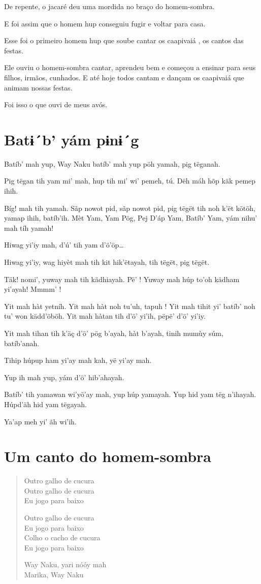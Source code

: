 De repente, o jacaré deu
uma mordida no braço do
homem-sombra.

E foi assim que
o homem hup
conseguiu fugir e
voltar para casa.

Esse foi o primeiro
homem hup que
soube cantar
os caapivaiá , os
cantos das festas.

Ele ouviu o homem-sombra cantar,
aprendeu bem e
começou a ensinar
para seus filhos,
irmãos, cunhados.
E até hoje todos
cantam e dançam os
caapivaiá que animam
nossas festas.

Foi isso o que ouvi de
meus avós.


\chapter{Batɨ´b’ yám pɨnɨ´g}


Batíb’ mah yup, Way Naku
batíb’ mah yup pöh yamah,
pig tëganah.

Pig tëgan tih yam mi’ mah,
hup tih mi’ wi’ pemeh, tú.
Dëh máh hõp käk pemep ihih.

Bíg! mah tih yamah. Sãp nowot
pid, sãp nowot pid, pig tëgët
tih noh k’ët kötöh, yamap ihih,
batíb’ih. Mèt Yam, Yam Pög, Pej
D’áp Yam, Batíb’ Yam, yám nihu’
mah tíh yamah!

Hiwag yi’iy mah,
d’ú’ tih yam d’ö’öp\ldots{}

Hiwag yi’iy, wag
hiyèt mah tih kit
hik’ëtayah, tih
tëgët, pig tëgët.

Täk! nomi’, yuway
mah tih kädhiayah.
Pë’ ! Yuway mah
húp to’oh kädham
yi’ayah! Mmmm’ !

Yit mah hàt yetníh. Yit
mah hàt noh tu’uh, tapuh !
Yit mah tihit yi’ batíb’ noh
tu’ won kädd’öböh. Yit
mah hàtan tih d’ö’ yi’ih,
pëpë’ d’ö’ yi’iy.

Yit mah tihan tih k’äç
d’ö’ pög b’ayah, hàt
b’ayah, tinih mumùy súm,
batíb’anah.

Tihip húpup ham
yi’ay mah kah, yë
yi’ay mah.

Yup ih mah yup, yám
d’ö’ hib’ahayah.

Batíb’ tih yamawan
wi’yö’ay mah, yup húp
yamayah. Yup hid yam
tëg n’ihayah. Húpd’äh
hid yam tëgayah.

Ya’ap meh yi’ ãh wi’ih.


\chapter{Um canto do homem-sombra}

\begin{verse}
Outro galho de cucura\\
Outro galho de cucura\\
Eu jogo para baixo

Outro galho de cucura\\
Eu jogo para baixo\\
Colho o cacho de cucura\\
Eu jogo para baixo

Way Naku, yari nóóy mah\\
Marika, Way Naku
\end{verse}

